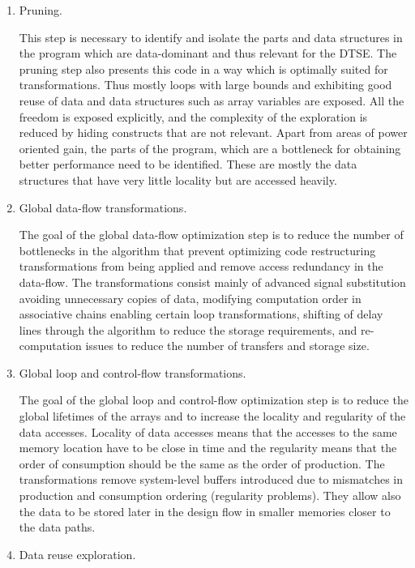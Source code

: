 \begin{enumerate}

\item Pruning.

This step is necessary to identify and isolate the parts and data structures in the program which are data-dominant and thus relevant for the DTSE. 
The pruning step also presents this code in a way which is optimally suited for transformations. 
Thus mostly loops with large bounds and exhibiting good reuse of data and data structures such as array variables are exposed.
 All the freedom is exposed explicitly, and the complexity of the exploration is reduced by hiding constructs that are not relevant. 
 Apart from areas of power oriented gain, the parts of the program, which are a bottleneck for obtaining better performance need to be identified. 
 These are mostly the data structures that have very little locality but are accessed heavily.
 
 \item Global data-flow transformations.
 
 The goal of the global data-flow optimization step is to reduce the number of bottlenecks in the algorithm that prevent optimizing code restructuring transformations from being applied and remove access redundancy in the data-flow. 
 The transformations consist mainly of advanced signal substitution avoiding unnecessary copies of data, modifying computation order in associative chains enabling certain loop transformations, shifting of delay lines through the algorithm to reduce the storage requirements, and re-computation issues to reduce the number of transfers and storage size. 
 
 \item Global loop and control-flow transformations.
 
 The goal of the global loop and control-flow optimization step is to reduce the global lifetimes of the arrays and to increase the locality and regularity of the data accesses.
  Locality of data accesses means that the accesses to the same memory location have to be close in time and the regularity means that the order of consumption should be the same as the order of production. 
  The transformations remove system-level buffers introduced due to mismatches in production and consumption ordering (regularity problems). 
  They allow also the data to be stored later in the design flow in smaller memories closer to the data paths.
  
  \item Data reuse exploration.
  

\end{enumerate}
